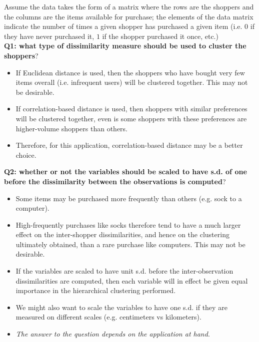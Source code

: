 \documentclass[11pt]{article}
\begin{document}
\noindent Assume the data takes the form of a matrix where the rows are the shoppers and the columns are the items available for purchase; the elements of the data matrix indicate the number of times a given shopper has purchased a given item (i.e. $0$ if they have never purchased it, $1$ if the shopper purchased it once, etc.) \\

\noindent \textbf{Q1: what type of dissimilarity measure should be used to cluster the shoppers}?
\begin{itemize}
    \item If Euclidean distance is used, then the shoppers who have bought very few items overall (i.e. infrequent users) will be clustered together. This may not be desirable.
    \item If correlation-based distance is used, then shoppers with similar preferences will be clustered together, even is some shoppers with these preferences are higher-volume shoppers than others.
    \item Therefore, for this application, correlation-based distance may be a better choice.
\end{itemize} \phantom{i}

\noindent \textbf{Q2: whether or not the variables should be scaled to have s.d. of one before the dissimilarity between the observations is computed}?
\begin{itemize}
    \item Some items may be purchased more frequently than others (e.g. sock to a computer).
    \item High-frequently purchases like socks therefore tend to have a much larger effect on the inter-shopper dissimilarities, and hence on the clustering ultimately obtained, than a rare purchase like computers. This may not be desirable.
    \item If the variables are scaled to have unit s.d. before the inter-observation dissimilarities are computed, then each variable will in effect be given equal importance in the hierarchical clustering performed.
    \item We might also want to scale the variables to have one s.d. if they are measured on different scales (e.g. centimeters vs kilometers).
    \item \textit{The answer to the question depends on the application at hand}.
\end{itemize}
\end{document}
